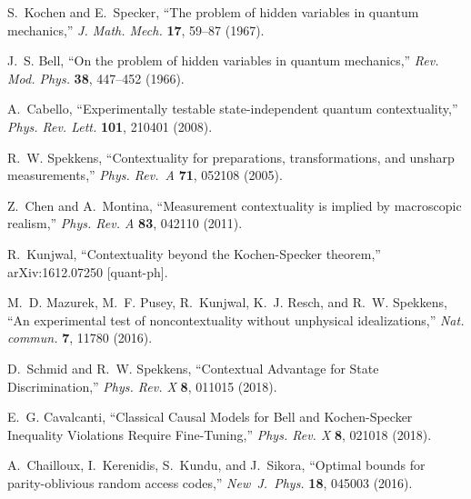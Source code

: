 \documentclass[a4paper,onecolumn,11pt,accepted=2018-05-04]{quantumarticle}
\begin{document}
\providecommand{\href}[2]{#2}
\raggedright
\begin{thebibliography}{10}

S.~Kochen and E.~Specker, ``The problem of hidden variables in quantum
  mechanics,'' \href{http://dx.doi.org/10.1512/iumj.1968.17.17004}{{\em J.
  Math. Mech.} {\bfseries 17}, 59--87 (1967)}.

J.~S. Bell, ``On the problem of hidden variables in quantum mechanics,''
  \href{http://dx.doi.org/10.1103/RevModPhys.38.447}{{\em Rev. Mod. Phys.}
  {\bfseries 38}, 447--452 (1966)}.

A.~{Cabello}, ``{Experimentally testable state-independent quantum
  contextuality},''
  \href{http://dx.doi.org/10.1103/PhysRevLett.101.210401}{{\em Phys. Rev.
  Lett.} {\bfseries 101}, 210401 (2008)}.

R.~W. {Spekkens}, ``{Contextuality for preparations, transformations, and
  unsharp measurements},''
  \href{http://dx.doi.org/10.1103/PhysRevA.71.052108}{{\em Phys. Rev.~A}
  {\bfseries 71}, 052108 (2005)}.

Z.~Chen and A.~Montina, ``Measurement contextuality is implied by macroscopic
  realism,'' \href{http://dx.doi.org/10.1103/PhysRevA.83.042110}{{\em Phys.
  Rev. A} {\bfseries 83}, 042110 (2011)}.

R.~Kunjwal, ``Contextuality beyond the Kochen-Specker theorem,''
  \href{http://arxiv.org/abs/1612.07250}{{\ttfamily arXiv:1612.07250
  [quant-ph]}}.

M.~D. Mazurek, M.~F. Pusey, R.~Kunjwal, K.~J. Resch, and R.~W. Spekkens, ``An
  experimental test of noncontextuality without unphysical idealizations,''
  \href{http://dx.doi.org/10.1038/ncomms11780}{{\em Nat. commun.} {\bfseries
  7}, 11780 (2016)}.

D.~Schmid and R.~W. Spekkens, ``Contextual Advantage for State
  Discrimination,'' \href{http://dx.doi.org/10.1103/PhysRevX.8.011015}{{\em
  Phys. Rev. X} {\bfseries 8}, 011015 (2018)}.

E.~G. Cavalcanti, ``Classical Causal Models for Bell and Kochen-Specker
  Inequality Violations Require Fine-Tuning,''
  \href{http://dx.doi.org/10.1103/PhysRevX.8.021018}{{\em Phys. Rev. X}
  {\bfseries 8}, 021018 (2018)}.

A.~Chailloux, I.~Kerenidis, S.~Kundu, and J.~Sikora, ``Optimal bounds for
  parity-oblivious random access codes,''
  \href{https://doi.org/10.1088/1367-2630/18/4/045003}{{\em
  New\ J.\ Phys.} {\bfseries 18}, 045003 (2016)}.


\end{thebibliography}
\end{document}
